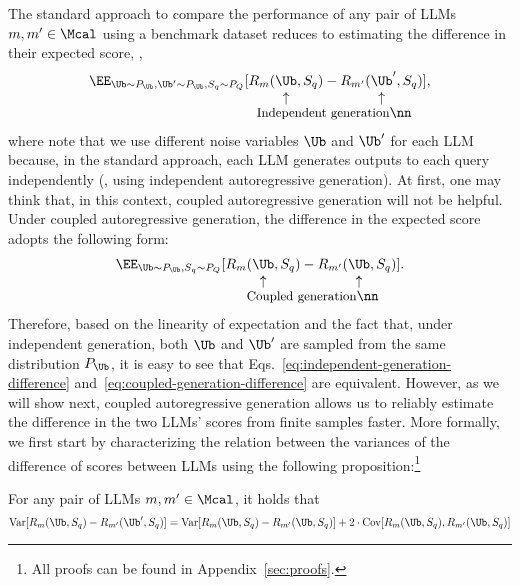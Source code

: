 The standard approach to compare the performance of any pair of LLMs $m, m' \in \Mcal$ using a benchmark dataset reduces to estimating the difference in their expected score, \ie,
%
\begin{align}
    \EE_{\Ub\sim P_{\Ub}, \Ub'\sim P_{\Ub}, S_q\sim P_Q} [&R_{m}(\vertarrowbox{\Ub}{}, S_q) - R_{m'}(\vertarrowbox{\Ub}{}', S_q)], \label{eq:independent-generation-difference} \\[-4ex]
    &\text{\small \hspace{1mm} Independent generation} \nn
\end{align}
%
where note that we use different noise variables $\Ub$ and $\Ub'$ for each LLM because, in the standard approach, each LLM generates outputs to each query independently (\ie, using independent autoregressive generation).
%
At first, one may think that, in this context, coupled autoregressive generation will not be helpful. 
%
Under coupled autoregressive generation, the difference in the expected score adopts the following form:
%
\begin{align}
\EE_{\Ub\sim P_{\Ub},S_q \sim P_Q} [R_m&(\vertarrowbox{\Ub}{},S_q)-R_{m'}(\vertarrowbox{\Ub}{},S_q)]. \label{eq:coupled-generation-difference} \\[-4ex] &\text{\small Coupled generation} \nn
\end{align}
%
Therefore, based on the linearity of expectation and the fact that, under independent generation, both $\Ub$ and $\Ub'$ are sampled from the same distribution $P_{\Ub}$, it is easy to see that Eqs.~\ref{eq:independent-generation-difference} and~\ref{eq:coupled-generation-difference} are equivalent. 
%
However, as we will show next, coupled autoregressive generation allows us to reliably estimate the difference in the two LLMs' scores from finite samples faster.
%
More formally, we first start by characterizing the relation between the variances of the difference of scores between LLMs using the following proposition:\footnote{All proofs can be found in Appendix~\ref{sec:proofs}.}
%
\begin{proposition}\label{prop:variance}
    For any pair of LLMs $m, m' \in \Mcal$, it holds that
    \begin{equation}\label{eq: variance shared noise}
        \textnormal{Var}[R_m(\Ub,S_q)-R_{m'}(\Ub',S_q) ]
        = \textnormal{Var}[R_m(\Ub,S_q)-R_{m'}(\Ub,S_q) ] + 2\cdot  \Cov[R_m(\Ub,S_q),R_{m'}(\Ub,S_q)]
    \end{equation}
\end{proposition}
